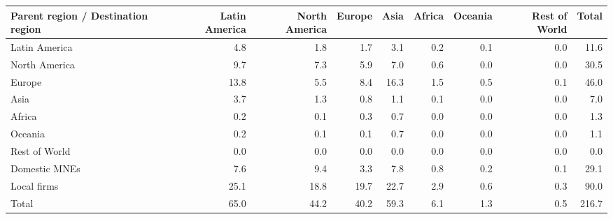 \begin{tabular}{lrrrrrrrr}
\toprule
Parent region / Destination region & Latin America & North America & Europe & Asia & Africa & Oceania & Rest of World & Total \\
\midrule
Latin America & 4.8 & 1.8 & 1.7 & 3.1 & 0.2 & 0.1 & 0.0 & 11.6 \\
North America & 9.7 & 7.3 & 5.9 & 7.0 & 0.6 & 0.0 & 0.0 & 30.5 \\
Europe & 13.8 & 5.5 & 8.4 & 16.3 & 1.5 & 0.5 & 0.1 & 46.0 \\
Asia & 3.7 & 1.3 & 0.8 & 1.1 & 0.1 & 0.0 & 0.0 & 7.0 \\
Africa & 0.2 & 0.1 & 0.3 & 0.7 & 0.0 & 0.0 & 0.0 & 1.3 \\
Oceania & 0.2 & 0.1 & 0.1 & 0.7 & 0.0 & 0.0 & 0.0 & 1.1 \\
Rest of World & 0.0 & 0.0 & 0.0 & 0.0 & 0.0 & 0.0 & 0.0 & 0.0 \\
Domestic MNEs & 7.6 & 9.4 & 3.3 & 7.8 & 0.8 & 0.2 & 0.1 & 29.1 \\
Local firms & 25.1 & 18.8 & 19.7 & 22.7 & 2.9 & 0.6 & 0.3 & 90.0 \\
\midrule
Total & 65.0 & 44.2 & 40.2 & 59.3 & 6.1 & 1.3 & 0.5 & 216.7 \\
\bottomrule
\end{tabular}
